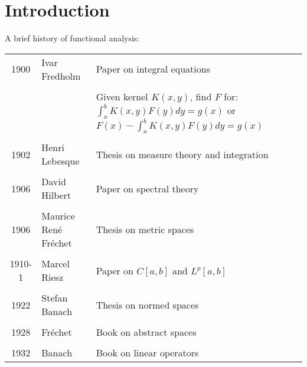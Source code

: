 \documentclass[letterpaper,12pt,fleqn]{article}
\begin{document}
\section*{Introduction}

A brief history of functional analysis:

\begin{tabular}{cll}
  1900 & Ivar Fredholm & Paper on integral equations \\
  \\
  & & \parbox{3in}{Given kernel $K(x,y)$, find $F$ for: \\
    $\int_a^bK(x,y)F(y)dy=g(x)$ or \\
    $F(x)-\int_a^bK(x,y)F(y)dy=g(x)$} \\
  \\
  1902 & Henri Lebesque & Thesis on measure theory and integration \\
  \\
  1906 & David Hilbert & Paper on spectral theory \\
  \\
  1906 & Maurice Ren\'{e} Fr\'{e}chet & Thesis on metric spaces \\
  \\
  1910-1 & Marcel Riesz & Paper on $C[a,b]$ and $L^p[a,b]$ \\
  \\
  1922 & Stefan Banach & Thesis on normed spaces \\
  \\
  1928 & Fr\'{e}chet & Book on abstract spaces \\
  \\
  1932 & Banach & Book on linear operators
\end{tabular}

\vspace {0.5in}

\end{document}

